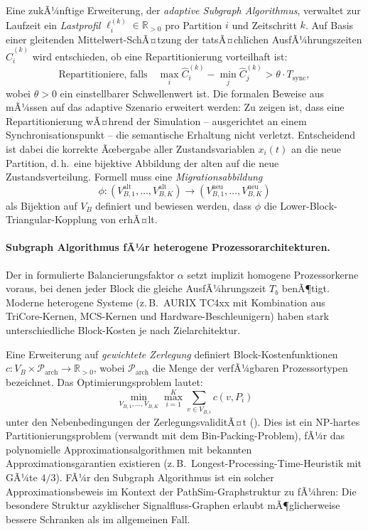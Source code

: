 ﻿\documentclass[12pt,a4paper]{article}
\theoremstyle{definition}
\begin{document}
Eine zukÃ¼nftige Erweiterung, der \emph{adaptive Subgraph Algorithmus},
verwaltet zur Laufzeit ein \emph{Lastprofil}
$\ell_i^{(k)} \in \mathbb{R}_{>0}$ pro Partition $i$ und Zeitschritt $k$.
Auf Basis einer gleitenden Mittelwert-SchÃ¤tzung der tatsÃ¤chlichen
AusfÃ¼hrungszeiten $\hat{C}_i^{(k)}$ wird entschieden, ob eine
Repartitionierung vorteilhaft ist:
\[
  \text{Repartitioniere, falls} \quad
  \max_i \hat{C}_i^{(k)} - \min_j \hat{C}_j^{(k)}
  > \theta \cdot T_{\mathrm{sync}},
\]
wobei $\theta > 0$ ein einstellbarer Schwellenwert ist. Die formalen
Beweise aus  mÃ¼ssen auf das
adaptive Szenario erweitert werden: Zu zeigen ist, dass eine
Repartitionierung wÃ¤hrend der Simulation -- ausgerichtet an einem
Synchronisationspunkt -- die semantische Erhaltung nicht verletzt.
Entscheidend ist dabei die korrekte Ãœbergabe aller Zustandsvariablen
$x_i(t)$ an die neue Partition, d.\,h.\ eine bijektive Abbildung
der alten auf die neue Zustandsverteilung. Formell muss eine
\emph{Migrationsabbildung}
\[
  \phi : (V_{B,1}^{\text{alt}},\ldots,V_{B,K}^{\text{alt}})
  \longrightarrow
  (V_{B,1}^{\text{neu}},\ldots,V_{B,K}^{\text{neu}})
\]
als Bijektion auf $V_B$ definiert und bewiesen werden, dass
$\phi$ die Lower-Block-Triangular-Kopplung von 
erhÃ¤lt.

\paragraph{Subgraph Algorithmus fÃ¼r heterogene Prozessorarchitekturen.}
Der in  formulierte Balancierungsfaktor $\alpha$
setzt implizit homogene Prozessorkerne voraus, bei denen jeder Block
die gleiche AusfÃ¼hrungszeit $T_b$ benÃ¶tigt. Moderne heterogene
Systeme (z.\,B.\ AURIX TC4xx mit Kombination aus
TriCore-Kernen, MCS-Kernen und Hardware-Beschleunigern) haben
stark unterschiedliche Block-Kosten je nach Zielarchitektur.

Eine Erweiterung auf \emph{gewichtete Zerlegung} definiert
Block-Kostenfunktionen $c : V_B \times \mathcal{P}_{\mathrm{arch}} \to \mathbb{R}_{>0}$,
wobei $\mathcal{P}_{\mathrm{arch}}$ die Menge der verfÃ¼gbaren
Prozessortypen bezeichnet. Das Optimierungsproblem lautet:
\[
  \min_{V_{B,1},\ldots,V_{B,K}} \max_{i=1}^K \sum_{v \in V_{B,i}} c(v, P_i)
\]
unter den Nebenbedingungen der ZerlegungsvaliditÃ¤t ().
Dies ist ein NP-hartes Partitionierungsproblem (verwandt mit dem
Bin-Packing-Problem), fÃ¼r das polynomielle Approximationsalgorithmen
mit bekannten Approximationsgarantien existieren (z.\,B.\ Longest-Processing-Time-Heuristik
mit GÃ¼te $4/3$). FÃ¼r den Subgraph Algorithmus ist ein solcher
Approximationsbeweis im Kontext der PathSim-Graphstruktur zu
fÃ¼hren: Die besondere Struktur azyklischer Signalfluss-Graphen
erlaubt mÃ¶glicherweise bessere Schranken als im allgemeinen Fall.
\end{document}
